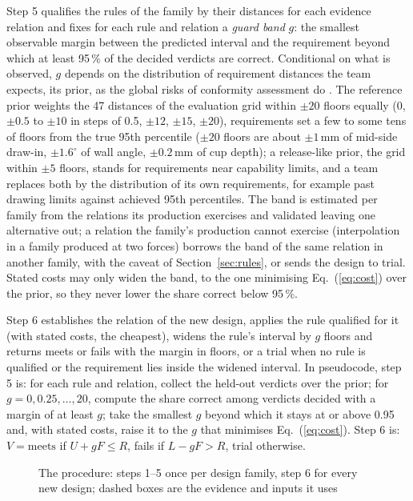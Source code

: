 \documentclass[pdflatex,sn-basic,lineno]{sn-jnl}
\begin{document}
Step 5 qualifies the rules of the family by their distances for each evidence relation and fixes for each rule and relation a \emph{guard band} $g$: the smallest observable margin between the predicted interval and the requirement beyond which at least 95\,\% of the decided verdicts are correct. Conditional on what is observed, $g$ depends on the distribution of requirement distances the team expects, its prior, as the global risks of conformity assessment do \citep{jcgm2012evaluation}. The reference prior weights the 47 distances of the evaluation grid within $\pm20$ floors equally (0, $\pm0.5$ to $\pm10$ in steps of 0.5, $\pm12$, $\pm15$, $\pm20$), requirements set a few to some tens of floors from the true 95th percentile ($\pm20$ floors are about $\pm1$\,mm of mid-side draw-in, $\pm1.6^\circ$ of wall angle, $\pm0.2$\,mm of cup depth); a release-like prior, the grid within $\pm5$ floors, stands for requirements near capability limits, and a team replaces both by the distribution of its own requirements, for example past drawing limits against achieved 95th percentiles. The band is estimated per family from the relations its production exercises and validated leaving one alternative out; a relation the family's production cannot exercise (interpolation in a family produced at two forces) borrows the band of the same relation in another family, with the caveat of Section~\ref{sec:rules}, or sends the design to trial. Stated costs may only widen the band, to the one minimising Eq.~(\ref{eq:cost}) over the prior, so they never lower the share correct below 95\,\%.

Step 6 establishes the relation of the new design, applies the rule qualified for it (with stated costs, the cheapest), widens the rule's interval by $g$ floors and returns meets or fails with the margin in floors, or a trial when no rule is qualified or the requirement lies inside the widened interval. In pseudocode, step 5 is: for each rule and relation, collect the held-out verdicts over the prior; for $g = 0, 0.25, \ldots, 20$, compute the share correct among verdicts decided with a margin of at least $g$; take the smallest $g$ beyond which it stays at or above 0.95 and, with stated costs, raise it to the $g$ that minimises Eq.~(\ref{eq:cost}). Step 6 is: $V = \text{meets}$ if $U+gF\le R$, fails if $L-gF>R$, trial otherwise.

\begin{figure}[t]
\centering

\caption{The procedure: steps 1--5 once per design family, step 6 for every new design; dashed boxes are the evidence and inputs it uses}\label{fig:procedure}
\end{figure}
\end{document}
